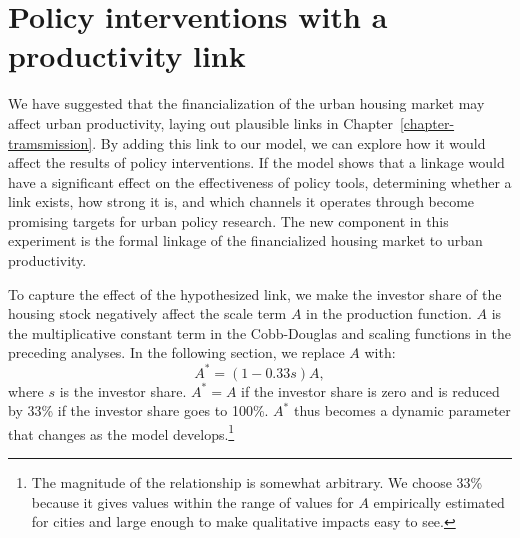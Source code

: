 \section{Policy interventions with a productivity link}

We have suggested that the financialization of the urban housing market may affect urban productivity, laying out plausible links in Chapter~\ref{chapter-tramsmission}. %
By adding this link to our model, we can explore how it would affect the results of policy interventions. If the model shows that a linkage would have a significant effect on the effectiveness of policy tools, determining whether a link exists, how strong it is, %
and which channels it operates through become promising targets for urban policy research. 
The new component in this experiment  %
is the formal linkage of the financialized housing market to urban productivity.

To capture the effect of the hypothesized link, we %
make the investor share of the housing stock negatively affect the scale term $A$ in the production function. $A$ is the multiplicative constant term in the Cobb-Douglas and scaling functions in the preceding analyses. In the following section, we replace $A$ with:   
\[A^*= (1-0.33s)A,\]
where $s$ is the investor share. $A^*= A$ if the investor share is zero and is reduced by 33\% if the investor share goes to 100\%. $A^*$ thus becomes a dynamic parameter that changes as the model develops.\footnote{The magnitude of the relationship is somewhat arbitrary. %
We choose 33\% because it gives values within the range of values for $A$ empirically estimated for cities and large enough to make qualitative impacts easy to see. %
} 



